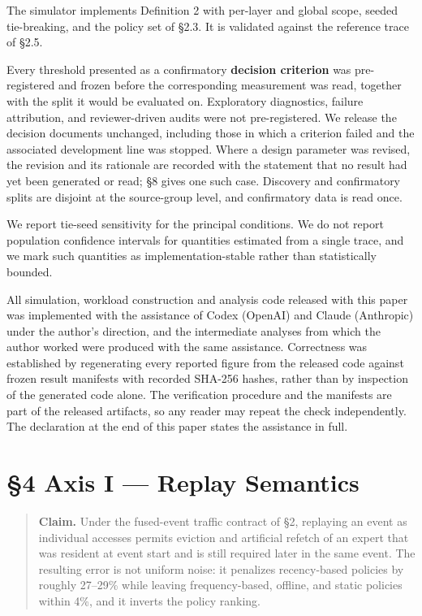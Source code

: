 \documentclass[
  10pt,
  letterpaper,
  10pt]{article}
\begin{document}
The simulator implements Definition 2 with per-layer and global scope,
seeded tie-breaking, and the policy set of §2.3. It is validated against
the reference trace of §2.5.

Every threshold presented as a confirmatory \textbf{decision criterion}
was pre-registered and frozen before the corresponding measurement was
read, together with the split it would be evaluated on. Exploratory
diagnostics, failure attribution, and reviewer-driven audits were not
pre-registered. We release the decision documents unchanged, including
those in which a criterion failed and the associated development line
was stopped. Where a design parameter was revised, the revision and its
rationale are recorded with the statement that no result had yet been
generated or read; §8 gives one such case. Discovery and confirmatory
splits are disjoint at the source-group level, and confirmatory data is
read once.

We report tie-seed sensitivity for the principal conditions. We do not
report population confidence intervals for quantities estimated from a
single trace, and we mark such quantities as implementation-stable
rather than statistically bounded.

All simulation, workload construction and analysis code released with
this paper was implemented with the assistance of Codex (OpenAI) and
Claude (Anthropic) under the author's direction, and the intermediate
analyses from which the author worked were produced with the same
assistance. Correctness was established by regenerating every reported
figure from the released code against frozen result manifests with
recorded SHA-256 hashes, rather than by inspection of the generated code
alone. The verification procedure and the manifests are part of the
released artifacts, so any reader may repeat the check independently.
The declaration at the end of this paper states the assistance in full.

\section{§4 Axis I --- Replay Semantics}\label{axis-i-replay-semantics}

\begin{quote}
\textbf{Claim.} Under the fused-event traffic contract of §2, replaying
an event as individual accesses permits eviction and artificial refetch
of an expert that was resident at event start and is still required
later in the same event. The resulting error is not uniform noise: it
penalizes recency-based policies by roughly 27--29\% while leaving
frequency-based, offline, and static policies within 4\%, and it inverts
the policy ranking.
\end{quote}
\end{document}

